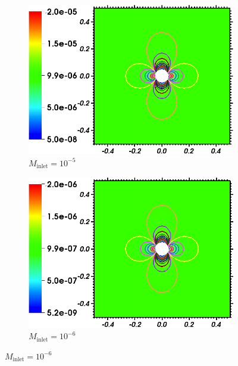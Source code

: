 \documentclass[review,10pt]{elsarticle}
\begin{document}
\begin{figure}[H]
        \begin{subfigure}[b]{0.495\textwidth}
                \centering
                \includegraphics[width=\textwidth]{figures/CylinderMach1em5ZoomIn.png}
                \caption{$M_{\text{inlet}}=10^{-5}$}
                \label{fig:cyl_1em5}
        \end{subfigure}
        \begin{subfigure}[b]{0.495\textwidth}
                \centering
                \includegraphics[width=\textwidth]{figures/CylinderMach1em6ZoomIn.png}
                \caption{$M_{\text{inlet}}=10^{-6}$}
                \label{fig:cyl_1em6}
        \end{subfigure}


\end{figure}
\end{document}
